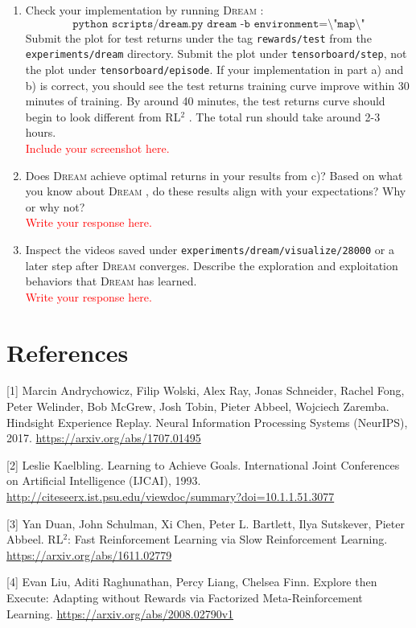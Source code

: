 \documentclass[12pt]{article}
\newcommand{\rl}{{RL$^2$ }}
\newcommand{\dream}{\textsc{Dream }}
\begin{document}
\begin{enumerate}[label=\alph*)]
    \item
        Check your implementation by running \dream:
        \begin{equation*}
            \texttt{python scripts/dream.py dream -b environment=\textbackslash"map\textbackslash"}
        \end{equation*}
        Submit the plot for test returns under the tag \texttt{rewards/test} from the \texttt{experiments/dream} directory.
        Submit the plot under \texttt{tensorboard/step}, not the plot under \texttt{tensorboard/episode}.
        If your implementation in part a) and b) is correct, you should see the test returns training curve improve within 30 minutes of training.
        By around 40 minutes, the test returns curve should begin to look different from \rl. The total run should take around 2-3 hours. \\
        \textcolor{red}{Include your screenshot here.}
        
    \item
        Does \dream achieve optimal returns in your results from c)? Based on what you know about \dream, do these results align with your expectations? Why or why not? \\ 
        \textcolor{red}{Write your response here.}
        
    \item
        Inspect the videos saved under \texttt{experiments/dream/visualize/28000} or a later step after \dream converges. Describe the exploration and exploitation behaviors that \dream has learned. \\
        \textcolor{red}{Write your response here.}
\end{enumerate}

\newpage

\section*{References}

[1] Marcin Andrychowicz, Filip Wolski, Alex Ray, Jonas Schneider, Rachel Fong, Peter Welinder, Bob McGrew, Josh Tobin, Pieter Abbeel, Wojciech Zaremba. Hindsight Experience Replay. Neural Information Processing Systems (NeurIPS), 2017. \url{https://arxiv.org/abs/1707.01495}

[2] Leslie Kaelbling. Learning to Achieve Goals. International Joint Conferences on Artificial Intelligence (IJCAI), 1993. \url{http://citeseerx.ist.psu.edu/viewdoc/summary?doi=10.1.1.51.3077}

[3] Yan Duan, John Schulman, Xi Chen, Peter L. Bartlett, Ilya Sutskever, Pieter Abbeel. RL$^2$: Fast Reinforcement Learning via Slow Reinforcement Learning. \url{https://arxiv.org/abs/1611.02779}

[4] Evan Liu, Aditi Raghunathan, Percy Liang, Chelsea Finn. Explore then Execute: Adapting without Rewards via Factorized Meta-Reinforcement Learning. \url{https://arxiv.org/abs/2008.02790v1}
\end{document}
